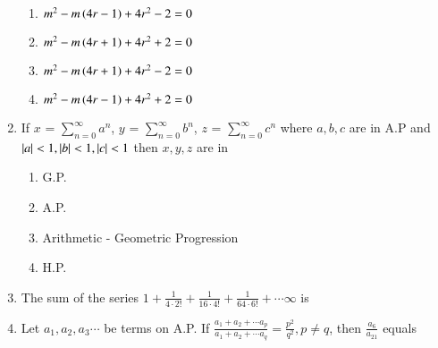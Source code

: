 \documentclass[journal,12pt,twocolumn]{IEEEtran}
\theoremstyle{remark}
\begin{document}
\begin{enumerate}[label={\arabic*.}]
{\hfill{}} 
\begin{enumerate}
\item  {$m^2-m\left(4r-1\right)+4r^2-2=0$}
\item  {$m^2-m\left(4r+1\right)+4r^2+2=0$}
\item  {$m^2-m\left(4r+1\right)+4r^2-2=0$}
\item  {$m^2-m\left(4r-1\right)+4r^2+2=0$}
\end{enumerate}

\item {If $x$ = $\sum\limits_{n=0}^{\infty}a^n$, $y$ = $\sum\limits_{n=0}^{\infty}b^n$, $z$ = $\sum\limits_{n=0}^{\infty}c^n$ where $a,b,c$ are in A.P and $\left\vert a\right\vert<1,\left\vert b\right\vert<1,\left\vert c\right\vert<1$ then $x,y,z$ are in}
{\hfill{}} 
\begin{enumerate}
\item  {G.P.}
\item  {A.P.}
\item  {Arithmetic - Geometric Progression}
\item  {H.P.}
\end{enumerate}

\item {The sum of the series $1+\frac{1}{4\cdot2!}+\frac{1}{16\cdot4!}+\frac{1}{64\cdot6!}+\cdots  \infty$ is}
{\hfill{}} 
\begin{enumerate}
\end{enumerate}

\item {Let $a_1, a_2, a_3 \cdots$ be terms on A.P. If $\frac{a_1+a_2+\cdots a_p}{a_1+a_2+\cdots a_q}= \frac{p^2}{q^2},p \neq q$, then $\frac{a_6}{a_{21}}$ equals}
{\hfill{} }
\begin{enumerate}
\end{enumerate}
\end{enumerate}
\end{document}
